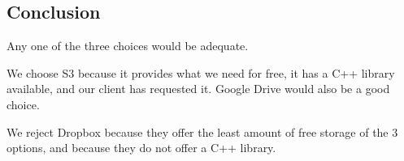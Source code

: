\subsection{ Conclusion }

Any one of the three choices would be adequate.

We choose S3 because it provides what we need for free, it has a C++ library available, and our client has requested it. Google Drive would also be a good choice.

We reject Dropbox because they offer the least amount of free storage of the 3 options, and because they do not offer a C++ library.

\newpage

%


